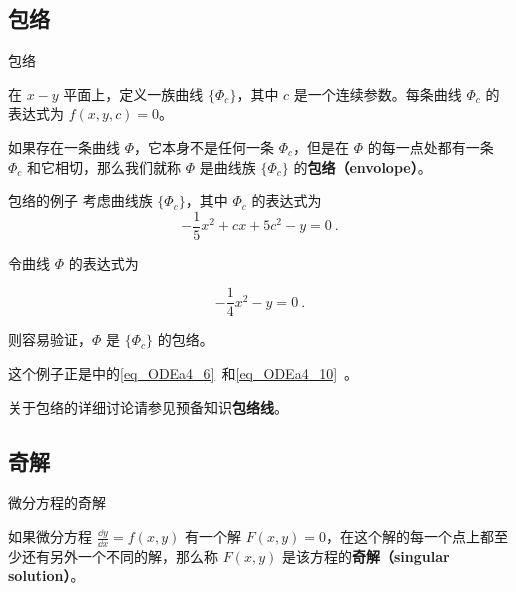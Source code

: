 

\subsection{包络}

\begin{definition}{包络}

在 $x-y$ 平面上，定义一族曲线 $\{\Phi_c\}$，其中 $c$ 是一个连续参数。每条曲线 $\Phi_c$ 的表达式为 $f(x, y, c)=0$。

如果存在一条曲线 $\Phi$，它本身不是任何一条 $\Phi_c$，但是在 $\Phi$ 的每一点处都有一条 $\Phi_c$ 和它相切，那么我们就称 $\Phi$ 是曲线族 $\{\Phi_c\}$ 的\textbf{包络（envolope）}。

\end{definition}

\begin{example}{包络的例子}
考虑曲线族 $\{\Phi_c\}$，其中 $\Phi_c$ 的表达式为
\begin{equation}
-\frac{1}{5}x^2+cx+5c^2-y=0~.
\end{equation}

令曲线 $\Phi$ 的表达式为

\begin{equation}
-\frac{1}{4}x^2-y=0~.
\end{equation}

则容易验证，$\Phi$ 是 $\{\Phi_c\}$ 的包络。

这个例子正是中的\autoref{eq_ODEa4_6}~和\autoref{eq_ODEa4_10}~。

\end{example}

关于包络的详细讨论请参见预备知识\textbf{包络线}。


\subsection{奇解}

\begin{definition}{微分方程的奇解}

如果微分方程 $\frac{\dd y}{\dd x}=f(x, y)$ 有一个解 $F(x, y)=0$，在这个解的每一个点上都至少还有另外一个不同的解，那么称 $F(x, y)$ 是该方程的\textbf{奇解（singular solution）}。

\end{definition}


